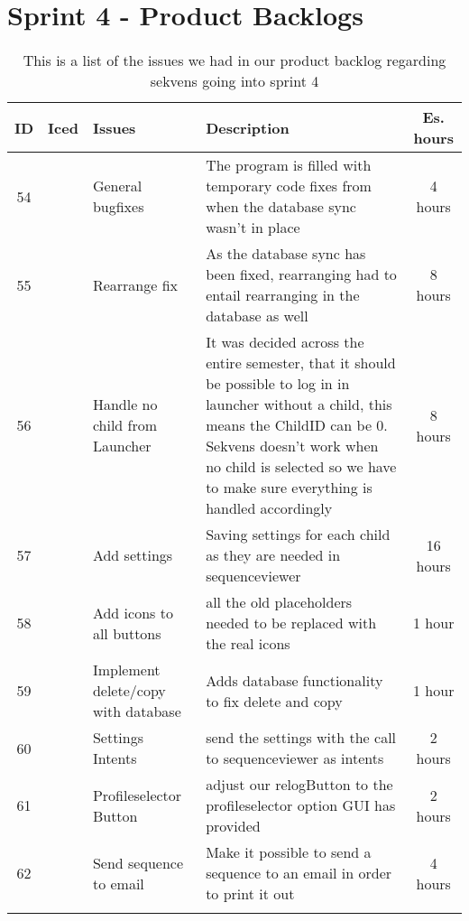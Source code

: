 \section{Sprint 4 - Product Backlogs}
\begin{longtable} { | c | c | p{5cm} | p{5cm} | c | } 
\hline
	ID 	&	Iced	&	Issues	&	Description		&	 Es. hours \\\hline
	54	& 	 	&	General bugfixes		& 	The program is filled with temporary code fixes from when the database sync wasn't in place	 & 4 hours  \\\hline
	55	& 	 	&	Rearrange fix	& 	As the database sync has been fixed, rearranging had to entail rearranging in the database as well	 &   8 hours \\\hline
	56	& 	 	&	Handle no child from Launcher	& 	It was decided across the entire semester, that it should be possible to log in in launcher without a child, this means the ChildID can be 0. Sekvens doesn't work when no child is selected so we have to make sure everything is handled accordingly	 &  8 hours \\\hline
	57	& 	 	&	Add settings	& 	Saving settings for each child as they are needed in sequenceviewer	& 	16 hours  \\\hline
	58	& 	 	&	Add icons to all buttons	& 	all the old placeholders needed to be replaced with the real icons	 & 	1 hour  \\\hline
	59	& 	 	&	Implement delete/copy with database	& 	Adds database functionality to fix delete and copy	 & 1 hour  \\\hline
	60	& 	 	&	Settings Intents		& 	send the settings with the call to sequenceviewer as intents	 &  2 hours \\\hline
	61	& 	 	&	Profileselector Button	& 	adjust our relogButton to the profileselector option GUI has provided	 &   2 hours 	 \\\hline
	62	& 	 	&	Send sequence to email	& 	Make it possible to send a sequence to an email in order to print it out &  4 hours \\\hline
\caption{This is a list of the issues we had in our product backlog regarding sekvens going into sprint 4}
\label{tab:spr4_prodblog}
\end{longtable}

